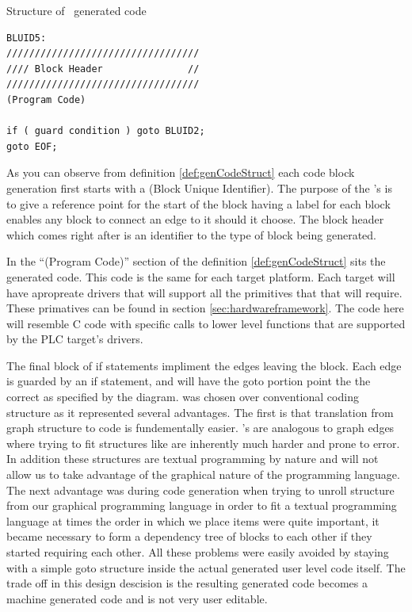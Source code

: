 \noindent\begin{minipage}{\textwidth}
\begin{definition}
\label{def:genCodeStruct}
Structure of \plcchart \  generated code

\begin{lstlisting}[frame=single]
BLUID5:
//////////////////////////////////
//// Block Header               //
//////////////////////////////////
(Program Code)

if ( guard condition ) goto BLUID2;
goto EOF;
\end{lstlisting}
\end{definition}
\end{minipage}

As you can observe from definition \ref{def:genCodeStruct} each code block generation first starts with a  (Block Unique Identifier). The purpose of the 's is to give a reference point for the start of the block having a  label for each block enables any block to connect an edge to it should it choose. The block header which comes right after is an identifier to the type of block being generated. 

In the ``(Program Code)'' section of the definition \ref{def:genCodeStruct} sits the generated  code. This code is the same for each target platform. Each  target will have apropreate drivers that will support all the primitives that that  will require. These primatives can be found in section \ref{sec:hardwareframework}. The code here will resemble C code with specific calls to lower level functions that are supported by the PLC target's drivers.

The final block of if statements impliment the edges leaving the block. Each edge is guarded by an if statement, and will have the goto portion point the the correct  as specified by the diagram.  was chosen over conventional coding structure as it represented several advantages. The first is that translation from graph structure to code is fundementally easier. 's are analogous to graph edges where trying to fit structures like   are inherently much harder and prone to error. In addition these structures are textual programming by nature and will not allow us to take advantage of the graphical nature of the programming language. The next advantage was during code generation when trying to unroll structure from our graphical programming language in order to fit a textual programming language at times the order in which we place items were quite important, it became necessary to form a dependency tree of blocks to each other if they started requiring each other. All these problems were easily avoided by staying with a simple goto structure inside the actual generated user level  code itself. The trade off in this design descision is the resulting generated code becomes a machine generated code and is not very user editable. 

